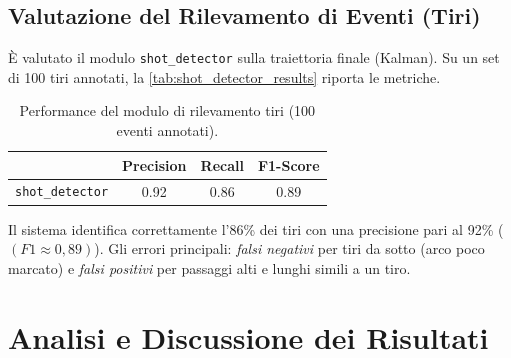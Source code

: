 \documentclass[12pt,a4paper,openright,twoside]{book}
\begin{document}

\subsection{Valutazione del Rilevamento di Eventi (Tiri)}
\label{sec:rilevamento-eventi-tiri}

È valutato il modulo \texttt{shot\_detector} sulla 
traiettoria finale (Kalman). 
Su un set di 100 tiri annotati, la 
\autoref{tab:shot_detector_results} riporta le metriche.

\begin{table}[t]
  \centering
  \caption{Performance del modulo di rilevamento tiri (100 eventi annotati).}
  \label{tab:shot_detector_results}
  \begin{tabular}{l S[table-format=1.2] S[table-format=1.2] S[table-format=1.2]}
    \toprule
    & {\textbf{Precision}} & {\textbf{Recall}} & {\textbf{F1-Score}} \\
    \midrule
    \texttt{shot\_detector} & 0.92 & 0.86 & 0.89 \\
    \bottomrule
  \end{tabular}
\end{table}

Il sistema identifica correttamente l'86\% dei tiri 
con una precisione pari al 92\% ($(F1 \approx 0,89)$).
Gli errori principali: \emph{falsi negativi} per tiri 
da sotto (arco poco marcato) e \emph{falsi positivi} 
per passaggi alti e lunghi simili a un tiro.

\section{Analisi e Discussione dei Risultati}
\label{sec:analisi-risultati}
\end{document}
